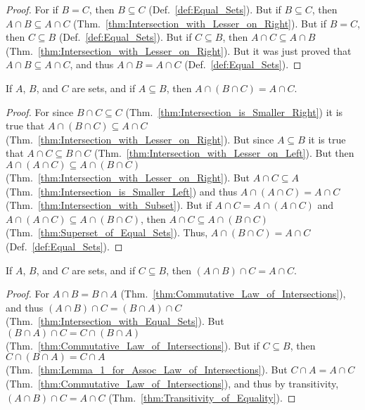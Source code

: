         \begin{proof}
            For if $B=C$, then $B\subseteq{C}$ (Def.~\ref{def:Equal_Sets}).
            But if $B\subseteq{C}$, then $A\cap{B}\subseteq{A}\cap{C}$
            (Thm.~\ref{thm:Intersection_with_Lesser_on_Right}). But if $B=C$,
            then $C\subseteq{B}$ (Def.~\ref{def:Equal_Sets}). But if
            $C\subseteq{B}$, then $A\cap{C}\subseteq{A}\cap{B}$
            (Thm.~\ref{thm:Intersection_with_Lesser_on_Right}). But it was just
            proved that $A\cap{B}\subseteq{A}\cap{C}$, and thus
            $A\cap{B}=A\cap{C}$ (Def.~\ref{def:Equal_Sets}).
        \end{proof}
        \begin{theorem}
            \label{thm:Lemma_1_for_Assoc_Law_of_Intersections}%
            If $A$, $B$, and $C$ are sets, and if $A\subseteq{B}$, then
            $A\cap(B\cap{C})=A\cap{C}$.
        \end{theorem}
        \begin{proof}
            For since $B\cap{C}\subseteq{C}$
            (Thm.~\ref{thm:Intersection_is_Smaller_Right}) it is true that
            $A\cap(B\cap{C})\subseteq{A}\cap{C}$
            (Thm.~\ref{thm:Intersection_with_Lesser_on_Right}). But since
            $A\subseteq{B}$ it is true that $A\cap{C}\subseteq{B}\cap{C}$
            (Thm.~\ref{thm:Intersection_with_Lesser_on_Left}). But then
            $A\cap(A\cap{C})\subseteq{A}\cap(B\cap{C})$
            (Thm.~\ref{thm:Intersection_with_Lesser_on_Right}). But
            $A\cap{C}\subseteq{A}$ (Thm.~\ref{thm:Intersection_is_Smaller_Left})
            and thus $A\cap(A\cap{C})=A\cap{C}$
            (Thm.~\ref{thm:Intersection_with_Subset}). But if
            $A\cap{C}=A\cap(A\cap{C})$ and
            $A\cap(A\cap{C})\subseteq{A}\cap(B\cap{C})$, then
            $A\cap{C}\subseteq{A}\cap(B\cap{C})$
            (Thm.~\ref{thm:Superset_of_Equal_Sets}). Thus,
            $A\cap(B\cap{C})=A\cap{C}$ (Def.~\ref{def:Equal_Sets}).
        \end{proof}
        \begin{theorem}
            \label{thm:Lemma_2_for_Assoc_Law_of_Intersections}%
            If $A$, $B$, and $C$ are sets, and if $C\subseteq{B}$, then
            $(A\cap{B})\cap{C}=A\cap{C}$.
        \end{theorem}
        \begin{proof}
            For $A\cap{B}=B\cap{A}$
            (Thm.~\ref{thm:Commutative_Law_of_Intersections}), and thus
            $(A\cap{B})\cap{C}=(B\cap{A})\cap{C}$
            (Thm.~\ref{thm:Intersection_with_Equal_Sets}). But
            $(B\cap{A})\cap{C}=C\cap(B\cap{A})$
            (Thm.~\ref{thm:Commutative_Law_of_Intersections}). But if
            $C\subseteq{B}$, then $C\cap(B\cap{A})=C\cap{A}$
            (Thm.~\ref{thm:Lemma_1_for_Assoc_Law_of_Intersections}). But
            $C\cap{A}=A\cap{C}$
            (Thm.~\ref{thm:Commutative_Law_of_Intersections}), and thus by
            transitivity, $(A\cap{B})\cap{C}=A\cap{C}$
            (Thm.~\ref{thm:Transitivity_of_Equality}).
        \end{proof}
